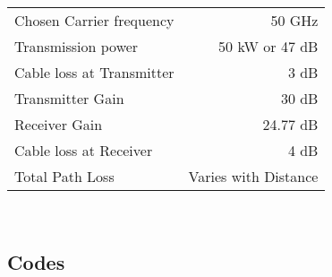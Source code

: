 \documentclass[a4paper,11pt]{article}%
\begin{document}
\begin{tabular}{l r}
Chosen Carrier frequency & 50 GHz\\
Transmission power & 50 kW or 47 dB\\
Cable loss at Transmitter & 3 dB\\
Transmitter Gain & 30 dB\\
Receiver Gain &24.77 dB\\
Cable loss at Receiver &4 dB\\
Total Path Loss & Varies with Distance\\
\end{tabular}\\[1cm]

\subsection{Codes}





\pagebreak



\end{document}
